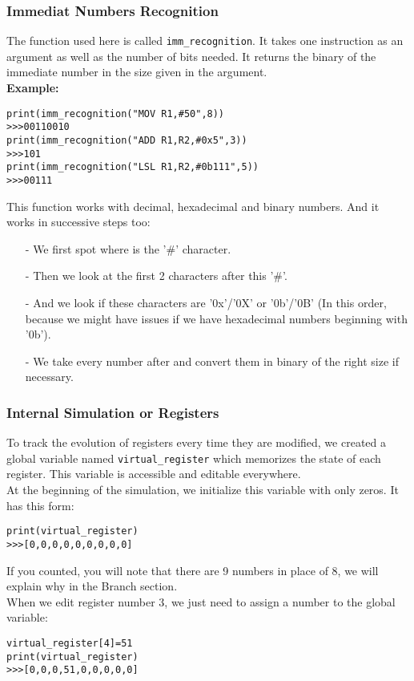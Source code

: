 \documentclass{article}
\newcommand{\code}[1]{\fontfamily{zi4}\texttt{#1}}
\begin{document}
\subsubsection{Immediat Numbers Recognition}
The function used here is called \code{imm\_recognition}. It takes one instruction as an argument as well as the number of bits needed. It returns the binary of the immediate number in the size given in the argument.\\
\textbf{Example:}
\begin{lstlisting}[language=MyPython]
print(imm_recognition("MOV R1,#50",8))
>>>00110010
print(imm_recognition("ADD R1,R2,#0x5",3))
>>>101
print(imm_recognition("LSL R1,R2,#0b111",5))
>>>00111
\end{lstlisting}
This function works with decimal, hexadecimal and binary numbers. And it works in successive steps too:
\begin{itemize}
    \item[-]We first spot where is the '\#' character.
    \item[-]Then we look at the first 2 characters after this '\#'.
    \item[-]And we look if these characters are '0x'/'0X' or '0b'/'0B' (In this order, because we might have issues if we have hexadecimal numbers beginning with '0b').
    \item[-]We take every number after and convert them in binary of the right size if necessary.
\end{itemize}

\subsubsection{Internal Simulation or Registers}
To track the evolution of registers every time they are modified, we created a global variable named \code{virtual\_register} which memorizes the state of each register. This variable is accessible and editable everywhere.\\
At the beginning of the simulation, we initialize this variable with only zeros. It has this form:
\begin{lstlisting}[language=MyPython]
print(virtual_register)
>>>[0,0,0,0,0,0,0,0,0]
\end{lstlisting}
If you counted, you will note that there are 9 numbers in place of 8, we will explain why in the Branch section.\\
When we edit register number 3, we just need to assign a number to the global variable:
\begin{lstlisting}[language=MyPython]
virtual_register[4]=51
print(virtual_register)
>>>[0,0,0,51,0,0,0,0,0]
\end{lstlisting}
\end{document}
